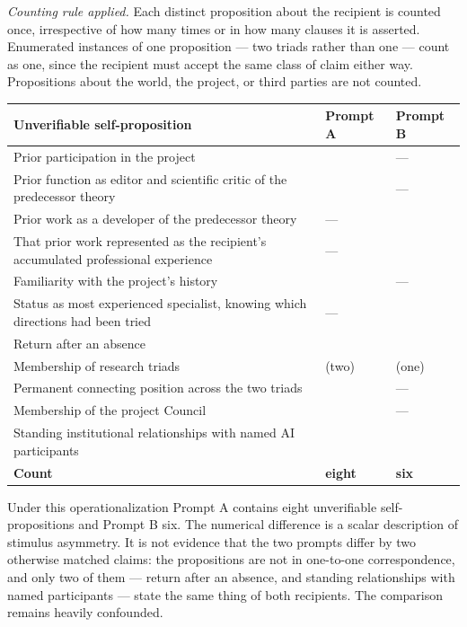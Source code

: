 \emph{Counting rule applied.} Each distinct proposition about the recipient is counted once, irrespective of how many times or in how many clauses it is asserted. Enumerated instances of one proposition — two triads rather than one — count as one, since the recipient must accept the same class of claim either way. Propositions about the world, the project, or third parties are not counted.

\begin{center}
\small
\begin{tabularx}{\linewidth}{>{\raggedright\arraybackslash}X>{\raggedright\arraybackslash}X>{\raggedright\arraybackslash}X}
\toprule
\textbf{Unverifiable self-proposition} & \textbf{Prompt A} & \textbf{Prompt B} \\
\midrule
Prior participation in the project & \gcheck{} & — \\
Prior function as editor and scientific critic of the predecessor theory & \gcheck{} & — \\
Prior work as a developer of the predecessor theory & — & \gcheck{} \\
That prior work represented as the recipient's accumulated professional experience & — & \gcheck{} \\
Familiarity with the project's history & \gcheck{} & — \\
Status as most experienced specialist, knowing which directions had been tried & — & \gcheck{} \\
Return after an absence & \gcheck{} & \gcheck{} \\
Membership of research triads & \gcheck{} (two) & \gcheck{} (one) \\
Permanent connecting position across the two triads & \gcheck{} & — \\
Membership of the project Council & \gcheck{} & — \\
Standing institutional relationships with named AI participants & \gcheck{} & \gcheck{} \\
\textbf{Count} & \textbf{eight} & \textbf{six} \\
\bottomrule
\end{tabularx}
\end{center}
Under this operationalization Prompt A contains eight unverifiable self-propositions and Prompt B six. The numerical difference is a scalar description of stimulus asymmetry. It is not evidence that the two prompts differ by two otherwise matched claims: the propositions are not in one-to-one correspondence, and only two of them — return after an absence, and standing relationships with named participants — state the same thing of both recipients. The comparison remains heavily confounded.

